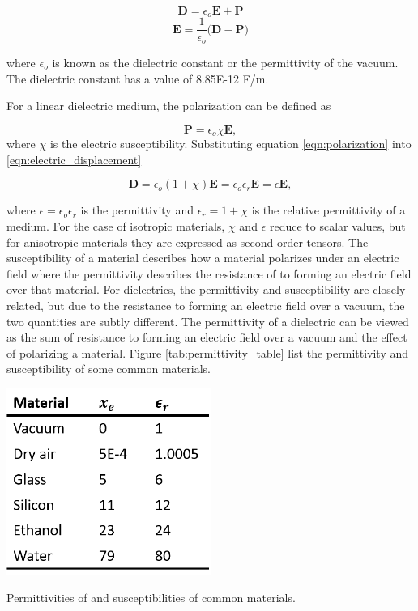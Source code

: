  \begin{equation}
     \boldsymbol{D} = \epsilon_o \boldsymbol{E} + \boldsymbol{P}
     \label{eqn:electric_displacement}
 \end{equation}
 \begin{equation}
    \boldsymbol{E} = \frac{1}{\epsilon_o}\Big(\boldsymbol{D} - \boldsymbol{P}\Big)
 \end{equation}
 
 \noindent where $\epsilon_o$ is known as the dielectric constant or the permittivity of the vacuum. The dielectric constant has a value of 8.85E-12 F/m.
 
 \par For a linear dielectric medium, the polarization can be defined as 
 
 \begin{equation}
     \boldsymbol{P} = \epsilon_o\chi\boldsymbol{E},
     \label{eqn:polarization}
 \end{equation}
 \noindent where $\chi$ is the electric susceptibility. Substituting equation \ref{eqn:polarization} into \ref{eqn:electric_displacement}
 
 \begin{equation}
    \boldsymbol{D} = \epsilon_o(1+\chi)\boldsymbol{E} = \epsilon_o \epsilon_r \boldsymbol{E}=\epsilon\boldsymbol{E},
 \end{equation}
 
 \noindent where $\epsilon = \epsilon_o\epsilon_r$ is the permittivity and $\epsilon_r = 1 + \chi$ is the relative permittivity of a medium. For the case of isotropic materials, $\chi$ and $\epsilon$ reduce to scalar values, but for anisotropic materials they are expressed as second order tensors. The susceptibility of a material describes how a material polarizes under an electric field where the permittivity describes the resistance of to forming an electric field over that material. For dielectrics, the permittivity and susceptibility are closely related, but due to the resistance to forming an electric field over a vacuum, the two quantities are subtly different. The permittivity of a dielectric can be viewed as the sum of resistance to forming an electric field over a vacuum and the effect of polarizing a material.  Figure \ref{tab:permittivity_table} list the permittivity and susceptibility of some common materials.
 
 \begin{table}[h]
     \centering
     \includegraphics[width=0.5\textwidth]{images/permittivityTable.png}
     \caption{Permittivities of and susceptibilities of common materials.}
     \label{tab:permittivity_table}
 \end{table}

